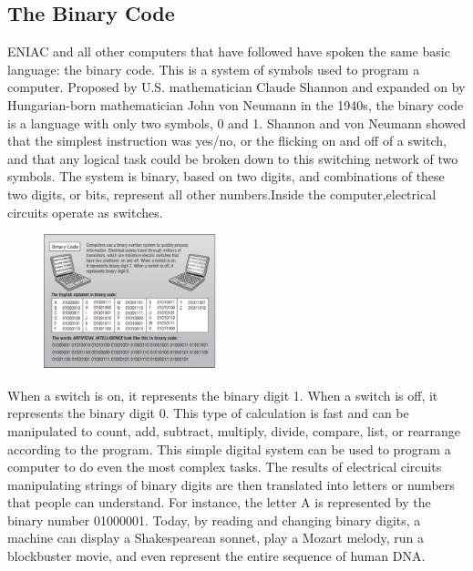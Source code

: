 \documentclass[12pt]{article}
\begin{document}
\subsection{The Binary Code}
\large 
ENIAC and all other computers that have followed have spoken the same basic language: the binary code. This is a system of symbols used to program a computer. Proposed by U.S. mathematician Claude Shannon and expanded on by Hungarian-born mathematician John von Neumann in the 1940s, the binary code is a language with only two symbols, 0 and 1. Shannon and von Neumann showed that the simplest instruction was yes/no, or the flicking on and off of a switch, and that any logical task could be broken down to this switching network of two symbols. The system is binary, based on two digits, and combinations of these two digits, or bits, represent all other numbers.Inside the computer,electrical circuits operate as switches.
\begin{figure}[h]
\center
  \includegraphics[width=5cm]{Image/IMG_20200125_233115.jpg}
  \caption{}
 \end{figure}
  When a switch is on, it represents the binary digit 1. When a switch is off, it represents the binary digit 0. This type of calculation is fast and can be manipulated to count, add, subtract, multiply, divide, compare, list, or rearrange according to the program. This simple digital system can be used to program a computer to do even the most complex tasks. The results of electrical circuits manipulating strings of binary digits are then translated into letters or numbers that people can understand. For instance, the letter A is represented by the binary number 01000001. Today, by reading and changing binary digits, a machine can display a Shakespearean sonnet, play a Mozart melody, run a blockbuster movie, and even represent the entire sequence of human DNA.\\
 
\Huge
\end{document}
